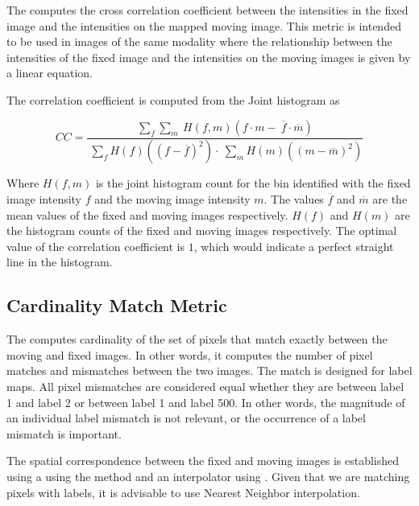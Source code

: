 The  computes the
cross correlation coefficient between the intensities in the fixed image and
the intensities on the mapped moving image. This metric is intended to be used
in images of the same modality where the relationship between the intensities
of the fixed image and the intensities on the moving images is given by a
linear equation.

The correlation coefficient is computed from the Joint histogram as

\begin{equation}
\label{eqn:CorrelationCoefficientHistogramImageToImageMetric}
CC = \frac{ \sum_f \sum_m { \
            H(f,m) \left( f \cdot m - \
            \overline{f} \cdot \overline{m} \right)  } }{ \
            \sum_f { H(f) \left( (f - \overline{f})^2 \right) } \cdot \
            \sum_m { H(m) \left( (m - \overline{m})^2 \right) } }
\end{equation}

Where $H(f,m)$ is the joint histogram count for the bin identified with the
fixed image intensity $f$ and the moving image intensity $m$. The values
$\overline{f}$ and $\overline{m}$ are the mean values of the fixed and moving
images respectively.  $H(f)$ and $H(m)$ are the histogram counts of the fixed
and moving images respectively. The optimal value of the correlation
coefficient is $1$, which would indicate a perfect straight line in the
histogram.


\subsection{Cardinality Match Metric}
The  computes cardinality of the
set of pixels that match exactly between the moving and fixed images. In other
words, it computes the number of pixel matches and mismatches between the two
images. The match is designed for label maps. All pixel mismatches are
considered equal whether they are between label 1 and label 2 or between label
1 and label 500. In other words, the magnitude of an individual label mismatch
is not relevant, or the occurrence of a label mismatch is important.

The spatial correspondence between the fixed and moving images is established using
a \doxygen{Transform} using the \code{SetTransform()} method and an interpolator
using \code{SetInterpolator()}. Given that we are matching pixels with labels,
it is advisable to use Nearest Neighbor interpolation.

